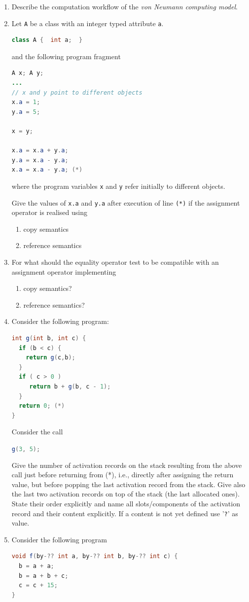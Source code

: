 \documentclass{article}
\begin{document}
\begin{enumerate}
\item Describe the computation workflow of the \emph{von Neumann
    computing model}.
\item Let \lstinline!A! be a class with an integer typed attribute
  \lstinline!a!.
\begin{lstlisting}[language=Java, columns=flexible]
class A {  int a;  }
\end{lstlisting}

and the following program fragment
\begin{lstlisting}[language=Java, columns=flexible] 
A x; A y;
...
// x and y point to different objects
x.a = 1;
y.a = 5;

x = y;

x.a = x.a + y.a;   
y.a = x.a - y.a;
x.a = x.a - y.a; (*)
\end{lstlisting}
where the program variables \lstinline!x! and \lstinline!y! refer
initially to different objects.

Give the values of \lstinline!x.a! and \lstinline!y.a! after execution
of line \lstinline!(*)! if the assignment operator is realised using
\begin{enumerate}
  \item copy semantics 
  \item reference semantics 
\end{enumerate}
\item For what should the equality operator test to be compatible with
  an assignment operator implementing 
  \begin{enumerate}
  \item copy semantics?
  \item reference semantics?
 \end{enumerate} 
\item Consider the following program:
\begin{lstlisting}[language=Java, columns=flexible] 
int g(int b, int c) {
  if (b < c) {
    return g(c,b); 
  }
  if ( c > 0 ) 
     return b + g(b, c - 1);
  }
  return 0; (*)
}
\end{lstlisting}

Consider the call 
\begin{center}
  \lstinline[language=Java, columns=flexible]{g(3, 5);} 
\end{center}
Give the number of activation records on the stack resulting from the
above call just before returning from (*), i.e., directly after
assigning the return value, but before popping the last activation
record from the stack. Give also the last two activation records on
top of the stack (the last allocated ones). State their order
explicitly and name all slots/components of the activation record and
their content explicitly. If a content is not yet defined use
'\texttt{?}' as value. 
\item Consider the following program
\begin{lstlisting}[language=Java, columns=flexible] 
void f(by-?? int a, by-?? int b, by-?? int c) {
  b = a + a;
  b = a + b + c;
  c = c + 15;
}


\end{lstlisting}
\end{enumerate}
\end{document}
